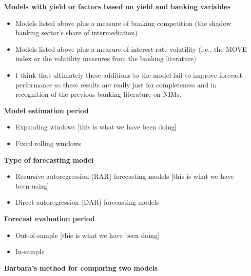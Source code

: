 \documentclass[11pt]{article}
\begin{document}
\textbf{Models with yield or factors based on yield and banking variables}

\begin{itemize}
\item Models listed above plus a measure of banking competition (the shadow banking sector's share of intermediation)
\item Models listed above plus a measure of interest rate volatility (i.e., the MOVE index or the volatility measures from the banking literature)
\item I think that ultimately these additions to the model fail to improve forecast performance so these results are really just for completeness and in recognition of the previous banking literature on NIMs.
\end{itemize}

\textbf{Model estimation period}

\begin{itemize}
\item Expanding windows [this is what we have been doing]
\item Fixed rolling windows
\end{itemize}

\textbf{Type of forecasting model}

\begin{itemize}
\item Recursive autoregression (RAR) forecasting models [this is what we have been using]
\item Direct autoregression (DAR) forecasting models
\end{itemize}

\textbf{Forecast evaluation period}

\begin{itemize}
\item Out-of-sample [this is what we have been doing] 
\item In-sample
\end{itemize}

\textbf{Barbara's method for comparing two models}
\end{document}
